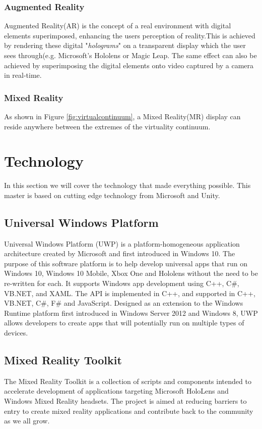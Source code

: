     \subsubsection{Augmented Reality}
    Augmented Reality(AR) is the concept of a real environment with digital elements superimposed, enhancing the users perception of reality.This is achieved by rendering these digital "\emph{holograms}"\cite{wdc-holo} on a transparent display which the user sees through(e.g. Microsoft's Hololens or Magic Leap. The same effect can also be achieved by superimposing the digital elements onto video captured by a camera in real-time.
    
    \subsubsection{Mixed Reality}
    As shown in Figure \ref{fig:virtualcontinuum}, a Mixed Reality(MR) display can reside anywhere between the extremes of the virtuality continuum. 

\section{Technology}
In this section we will cover the technology that made everything possible. This master is based on cutting edge technology from Microsoft and Unity.

    \subsection{Universal Windows Platform}
    Universal Windows Platform (UWP) is a platform-homogeneous application architecture created by Microsoft and first introduced in Windows 10. The purpose of this software platform is to help develop universal apps that run on Windows 10, Windows 10 Mobile, Xbox One and Hololens without the need to be re-written for each. It supports Windows app development using C++, C\#, VB.NET, and XAML. The API is implemented in C++, and supported in C++, VB.NET, C\#, F\# and JavaScript. Designed as an extension to the Windows Runtime platform first introduced in Windows Server 2012 and Windows 8, UWP allows developers to create apps that will potentially run on multiple types of devices. %
    
    \subsection{Mixed Reality Toolkit}
    The Mixed Reality Toolkit is a collection of scripts and components intended to accelerate development of applications targeting Microsoft HoloLens and Windows Mixed Reality headsets. The project is aimed at reducing barriers to entry to create mixed reality applications and contribute back to the community as we all grow. %


